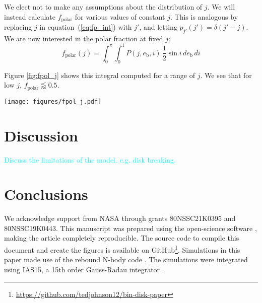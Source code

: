\documentclass[twocolumn]{aastex631}
\newcommand\ghurl[0]{\url{https://github.com/tedjohnson12/bin-disk-paper}}
\newcommand{\RGM}[1]{\textcolor{cyan}{#1}}
\begin{document}
We elect not to make any assumptions about the distribution of $j$. We will instead calculate $f_\text{polar}$ for various values of constant $j$. This is analogous by replacing $j$ in equation~(\ref{eq:fp_int}) with $j'$, and letting $p_{j'}(j') = \delta(j'-j)$. We are now interested in the polar fraction at fixed $j$:
\begin{equation}
    f_\text{polar}(j) = \int_{0}^{\pi} \int_{0}^{1} P(j,e_\text{b},i)\, \frac{1}{2} \sin{i}\,de_\text{b}\,di
\end{equation}

Figure \ref{fig:fpol_j} shows this integral computed for a range of $j$. We see that for low $j$, $f_\text{polar} \lessapprox 0.5$.

\begin{figure*}
    \centering
    \texttt{[image: figures/fpol\_j.pdf]}
    \caption{
        Polar fraction $f_\text{polar}$ upper limit as a function of normalized disk angular momentum $j$. These simulations assume a population of binary systems with constant $j$, random $e_\text{b}$, and disks whose angular momentum vectors are distributed isotropically with respect to the binary angular momentum. These values were computed using the analytic technique described in Section \ref{sec:analytic}.
    }
    \label{fig:fpol_j}
\end{figure*}


\section{Discussion}
\label{sec:discussion}

\RGM{Discuss the limitations of the model. e.g.  disk breaking.}

\section{Conclusions}
\label{sec:conclusions}





\begin{acknowledgements}
\label{sec:ack}

We acknowledge support from NASA through grants 80NSSC21K0395 and 80NSSC19K0443. This manuscript was prepared using the open-science software \href{https://show-your.work/en/latest/intro/}{\showyourwork} \citep{luger2021}, making the article completely
reproducible. The source code to compile this document and create the figures is available on GitHub\footnote{\ghurl}.
Simulations in this paper made use of the {\sc rebound} N-body code \citep{rebound}.
The simulations were integrated using IAS15, a 15th order Gauss-Radau integrator \citep{reboundias15}. 

\end{acknowledgements}


\end{document}
